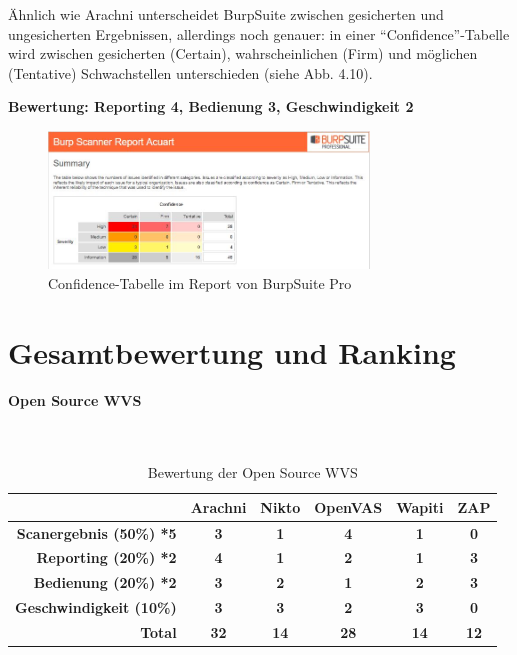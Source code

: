 \documentclass[12pt,oneside,a4paper,parskip,pointlessnumbers]{scrbook}
\begin{document}
\begin{itemize}
          Ähnlich wie Arachni unterscheidet BurpSuite zwischen gesicherten und ungesicherten Ergebnissen, allerdings noch genauer: in einer ``Confidence''-Tabelle wird zwischen gesicherten (Certain), wahrscheinlichen (Firm) und möglichen (Tentative) Schwachstellen unterschieden (siehe Abb. 4.10).

          \textbf{Bewertung: Reporting 4, Bedienung 3, Geschwindigkeit 2}
          \begin{figure}[htb!]
            \centering
            \includegraphics[width=0.76\textwidth]{Images/BurpReport}
            \caption[Confidence-Tabelle im Report von BurpSuite Pro]{Confidence-Tabelle im Report von BurpSuite Pro}
          \end{figure}
     \end{itemize}
     \section{Gesamtbewertung und Ranking}
     \paragraph{Open Source WVS}
     \
       \begin{table}[H]
       \begin{tabular}{|r|c|c|c|c|c|}
       \hline
       \textbf{}            & \textbf{Arachni} & \textbf{Nikto} & \textbf{OpenVAS} & \textbf{Wapiti} & \textbf{ZAP}  \\
       \hline
       \textbf{Scanergebnis (50\%) *5}    & \textbf{3}      &  \textbf{1}      & \textbf{4}      &   \textbf{1}     &  \textbf{0}       \\
       \hline
       \textbf{Reporting (20\%) *2}       &  \textbf{4}     &  \textbf{1}      & \textbf{2}      &   \textbf{1}    &   \textbf{3}     \\
       \hline
       \textbf{Bedienung (20\%) *2}       & \textbf{3}       & \textbf{2}     & \textbf{1}       & \textbf{2}      & \textbf{3}        \\
       \hline
       \textbf{Geschwindigkeit (10\%)} & \textbf{3}       & \textbf{3}    & \textbf{2}       & \textbf{3}     & \textbf{0}          \\
       \hline
       \textbf{Total}                 &   \textbf{32}     &  \textbf{14}   &  \textbf{28}      &  \textbf{14}    &  \textbf{12}          \\
       \hline
       \end{tabular}
       \caption[Bewertung der Open Source WVS]{Bewertung der Open Source WVS}
     \end{table}
\end{document}
